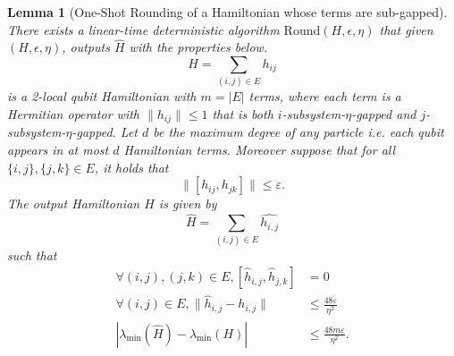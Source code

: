 \documentclass[11pt]{article}
\theoremstyle{plain}
\newtheorem{lemma}[theorem]{Lemma}
\newcommand{\eps}{\varepsilon}
\begin{document}
\begin{lemma}[One-Shot Rounding of a Hamiltonian whose terms are sub-gapped]
\label{lemma:rounding-hamiltonian}
There exists a linear-time deterministic algorithm $\mathrm{Round}(H, \epsilon, \eta)$ that given $(H, \epsilon, \eta)$, outputs $\widehat{H}$ with the properties below.
\[ H = \sum_{(i,j) \in E} h_{ij}\] is a 2-local qubit Hamiltonian with $m = |E|$ terms, where each term is a Hermitian operator with $\| h_{ij} \| \leq 1$ that is both $i$-subsystem-$\eta$-gapped and $j$-subsystem-$\eta$-gapped. Let $d$ be the maximum degree of any particle i.e. each qubit appears in at most $d$ Hamiltonian terms. Moreover suppose that for all $\{i,j\}, \{j,k\} \in E$, it holds that
\[ \| [h_{ij}, h_{jk} ] \| \leq \eps. \]
The output Hamiltonian $\widehat{H}$ is given by
\[ \widehat{H} = \sum_{(i,j) \in E} \widehat{h_{i,j}}\]
such that
\begin{align} 
\forall (i,j), (j,k) \in E, [\hat{h}_{i,j}, \hat{h}_{j,k}] &= 0 \label{eq:exact-commutation} \\ 
\forall (i,j) \in E, \| \hat{h}_{i,j} - h_{i,j} \| &\leq \frac{48\eps}{\eta^2} \label{eq:rounding-error}\\
|\lambda_{\min}(\hat{H}) - \lambda_{\min}(H)| & \leq \frac{48 m \eps}{\eta^2}.
\label{eq:min-eigenvalue-rounded-hamiltonian}
\end{align}

\end{lemma}
\end{document}
